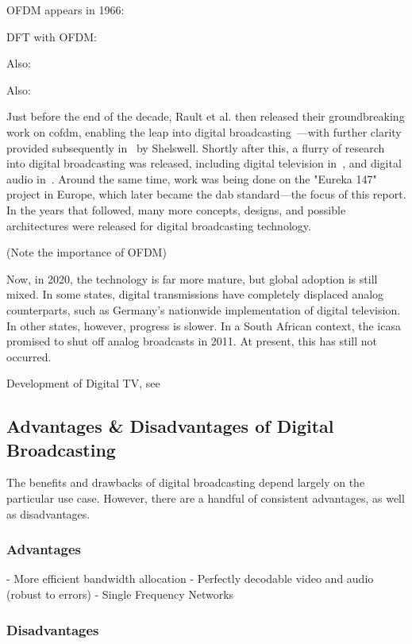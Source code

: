 \documentclass[class=report,11pt,crop=false]{standalone}
\begin{document}
OFDM appears in 1966: \cite{Chang1966}

DFT with OFDM: \cite{Weinstein1971}

Also: \cite{lassalle1987principles}

Also: \cite{Alard1988}

Just before the end of the decade, Rault et al. then released their groundbreaking work on \gls{cofdm}, enabling the leap into digital broadcasting~\cite{Raulta}---with further clarity provided subsequently in~\cite{Shelswell1995} by Shelswell. Shortly after this, a flurry of research into digital broadcasting was released, including digital television in~\cite{Bernard1992, stare1992}, and digital audio in~\cite{shelswell1991, Price1992, Maddocks1992}. Around the same time, work was being done on the "Eureka 147" project in Europe, which later became the \gls{dab} standard---the focus of this report. In the years that followed, many more concepts, designs, and possible architectures were released for digital broadcasting technology.

(Note the importance of OFDM)

Now, in 2020, the technology is far more mature, but global adoption is still mixed. In some states, digital transmissions have completely displaced analog counterparts, such as Germany's nationwide implementation of digital television. In other states, however, progress is slower. In a South African context, the \gls{icasa} promised to shut off analog broadcasts in 2011. At present, this has still not occurred.

Development of Digital TV, see~\cite{Wu2006}

\subsection{Advantages \& Disadvantages of Digital Broadcasting}
The benefits and drawbacks of digital broadcasting depend largely on the particular use case. However, there are a handful of consistent advantages, as well as disadvantages.

\subsubsection{Advantages}
- More efficient bandwidth allocation
- Perfectly decodable video and audio (robust to errors)
- Single Frequency Networks

\subsubsection{Disadvantages}
\end{document}
